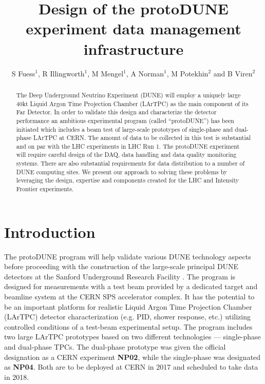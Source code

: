 \documentclass[a4paper]{jpconf}
\newcommand{\pd}{protoDUNE\xspace}
\begin{document}
\title{Design of the \pd experiment data management infrastructure}

\author{S Fuess$^1$, R Illingworth$^1$, M Mengel$^1$, A Norman$^1$, M Potekhin$^2$ and B Viren$^2$}

\address{$^1$ Fermi National Accelerator Laboratory, Batavia, IL 60510, USA}
\address{$^2$ Brookhaven National Laboratory, Upton, NY 11973, USA}


\begin{abstract}
The Deep Underground Neutrino Experiment (DUNE) will employ a uniquely large 40kt Liquid Argon
Time Projection Chamber (LArTPC) as the main component of its Far Detector.
In order to validate this design and characterize the detector performance an
ambitious experimental program (called ``\pd'') has been
initiated which includes a beam test of large-scale prototypes of single-phase and dual-phase LArTPC
at CERN. The amount of data to be collected in this test is substantial and on par with the LHC experiments
in LHC Run 1. The protoDUNE experiment will require careful design of the DAQ, data handling and
data quality monitoring systems. There are also substantial requirements for data distribution
to a number of DUNE computing sites. We present our approach to solving these problems by
leveraging the design, expertise and components created for the LHC and Intensity Frontier
experiments. 
\end{abstract}

\section{Introduction}
The \pd program will help validate various DUNE technology aspects before proceeding with
the construction of the large-scale principal DUNE detectors at the Sanford Underground Research Facility \cite{cdrVol1, cdrVol4}.
The program is designed for measurements with a test beam provided by a dedicated target and beamline system
at the CERN SPS accelerator complex. It has the potential to be an important platform for realistic
Liquid Argon Time Projection Chamber (LArTPC) detector characterization (e.g. PID, shower response, etc.)
utilizing controlled conditions of a test-beam experimental setup. The program includes two
large LArTPC prototypes based on two different technologies --- single-phase and dual-phase TPCs.
The dual-phase prototype was given the official designation as a CERN experiment \textbf{NP02},
while the single-phase was designated as \textbf{NP04}. Both are to be deployed at CERN in 2017
and scheduled to take data in 2018.
\end{document}

